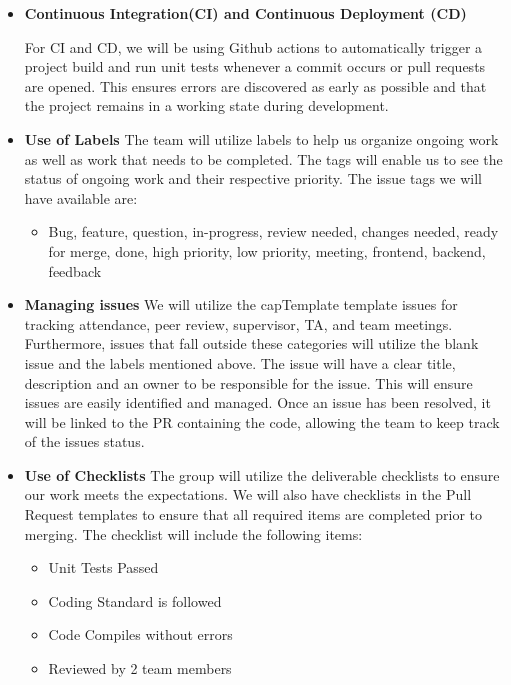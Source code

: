 \documentclass{article}
\begin{document}
\begin{itemize}
	\item\textbf{Continuous Integration(CI) and Continuous Deployment (CD)}
	
  For CI and CD, we will be using Github actions to automatically trigger a project build and run unit tests 
  whenever a commit occurs or pull requests are opened. This ensures errors are discovered as early as possible 
  and that the project remains in a working state during development. 

  \item \textbf{Use of Labels} \newline
  The team will utilize labels to help us organize ongoing work as well as work that needs to be completed. The tags will enable us to see the status of ongoing work and their respective priority. 
    The issue tags we will have available are:
     \begin{itemize} 
        \item Bug, feature, question, in-progress, review needed, changes needed, ready for merge, done, high priority, low priority, meeting, frontend, backend, feedback 
    \end{itemize}
   \item \textbf{Managing issues}\newline
  We will utilize the capTemplate template issues for tracking attendance, peer review, supervisor, TA, and team meetings. Furthermore, issues that fall outside these categories will utilize the blank issue and the labels mentioned above. \newline
  The issue will have a clear title, description and an owner to be responsible for the issue. This will ensure issues are easily identified and managed. Once an issue has been resolved, it will be linked to the PR containing the code, allowing the team to keep track of the issues status.
  \item \textbf{Use of Checklists} \newline
  The group will utilize the deliverable checklists to ensure our work meets the expectations. 
  We will also have checklists in the Pull Request templates to ensure that all required items are completed prior to merging. The checklist will include the following items: 
  \begin{itemize}
    \item Unit Tests Passed
    \item Coding Standard is followed 
    \item Code Compiles without errors
    \item Reviewed by 2 team members

\end{itemize}
\end{itemize}
\end{document}
